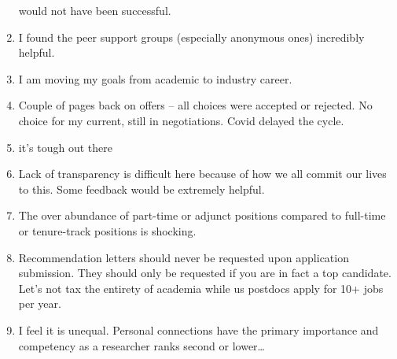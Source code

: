 \documentclass[]{article}
\begin{document}
\begin{enumerate}
  would not have been successful.
\item
  I found the peer support groups (especially anonymous ones) incredibly
  helpful.
\item
  I am moving my goals from academic to industry career.
\item
  Couple of pages back on offers -- all choices were accepted or
  rejected. No choice for my current, still in negotiations. Covid
  delayed the cycle.
\item
  it's tough out there
\item
  Lack of transparency is difficult here because of how we all commit
  our lives to this. Some feedback would be extremely helpful.
\item
  The over abundance of part-time or adjunct positions compared to
  full-time or tenure-track positions is shocking.
\item
  Recommendation letters should never be requested upon application
  submission. They should only be requested if you are in fact a top
  candidate. Let's not tax the entirety of academia while us postdocs
  apply for 10+ jobs per year.
\item
  I feel it is unequal. Personal connections have the primary importance
  and competency as a researcher ranks second or lower\ldots{}
\end{enumerate}
\end{document}
